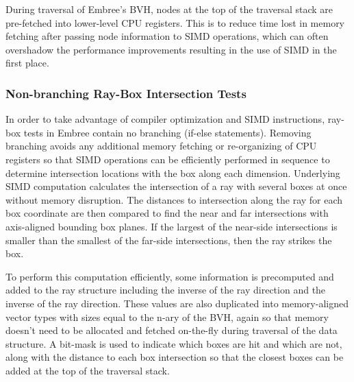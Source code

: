 During traversal of Embree's BVH, nodes at the top of the traversal stack are
pre-fetched into lower-level CPU registers. This is to reduce time lost in
memory fetching after passing node information to SIMD operations, which can
often overshadow the performance improvements resulting in the use of SIMD in
the first place.

\subsubsection{Non-branching Ray-Box Intersection Tests}

In order to take advantage of compiler optimization and SIMD instructions,
ray-box tests in Embree contain no branching (if-else statements). Removing
branching avoids any additional memory fetching or re-organizing of CPU
registers so that SIMD operations can be efficiently performed in sequence to
determine intersection locations with the box along each dimension. Underlying
SIMD computation calculates the intersection of a ray with several boxes at once
without memory disruption. The distances to intersection along the ray for each
box coordinate are then compared to find the near and far intersections with
axis-aligned bounding box planes. If the largest of the near-side intersections
is smaller than the smallest of the far-side intersections, then the ray strikes
the box.

To perform this computation efficiently, some information is precomputed and
added to the ray structure including the inverse of the ray direction and the
inverse of the ray direction. These values are also duplicated into
memory-aligned vector types with sizes equal to the n-ary of the BVH, again so
that memory doesn't need to be allocated and fetched on-the-fly during traversal
of the data structure. A bit-mask is used to indicate which boxes are hit and
which are not, along with the distance to each box intersection so that the
closest boxes can be added at the top of the traversal stack.

